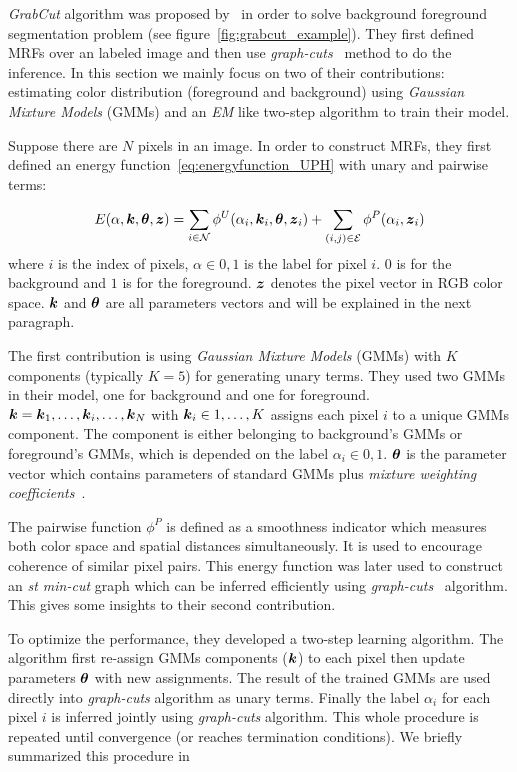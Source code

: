 \emph{GrabCut} algorithm was proposed
by~ in order to solve background
foreground segmentation problem (see
figure~\ref{fig:grabcut_example}). They first defined MRFs over
an labeled image and then use
\emph{graph-cuts}~\cite{Boykov:ICCV01} method to do the
inference. In this section we mainly focus on two of their
contributions: estimating color distribution (foreground and
background) using \emph{Gaussian Mixture Models} (GMMs) and an
\emph{EM} like two-step algorithm to train their model.

Suppose there are $N$ pixels in an image. In order to construct
MRFs, they first defined an energy
function~\eqref{eq:energyfunction_UPH} with unary and pairwise
terms:

\begin{align}
  \label{eq:grabcut_energy}
  E(\alpha, {\boldsymbol{k}}, \boldsymbol{\theta}, {\boldsymbol{z}}) = 
  \sum_{i\in {\cal N}}{\phi^U(\alpha_i, {\boldsymbol{k}}_i, \boldsymbol{\theta}, {\boldsymbol{z}}_i)}+
  \sum_{(i,j)\in {\cal E}}{\phi^P(\alpha_i,{\boldsymbol{z}}_i)}
\end{align}
where $i$ is the index of pixels, $\alpha \in {0,1}$ is the label
for pixel $i$. $0$ is for the background and $1$ is for the
foreground. ${\boldsymbol{z}}$ denotes the pixel vector in RGB color space.
${\boldsymbol{k}}$ and $\boldsymbol{\theta}$ are all parameters vectors and will be
explained in the next paragraph. 

The first contribution is using \emph{Gaussian Mixture Models}
(GMMs) with $K$ components (typically $K=5$) for generating unary
terms. They used two GMMs in their model, one for background and
one for foreground. ${\boldsymbol{k}}={{\boldsymbol{k}}_1,\dots,{\boldsymbol{k}}_i,\dots,{\boldsymbol{k}}_N}$ with
${\boldsymbol{k}}_i\in 1,\dots,K$ assigns each pixel $i$ to a unique GMMs
component. The component is either belonging to background's GMMs
or foreground's GMMs, which is depended on the label $\alpha_i\in
{0,1}$. $\boldsymbol{\theta}$ is the parameter vector which contains
parameters of standard GMMs plus \emph{mixture weighting
  coefficients}~\cite{Rother:SIGGRAPH04}.

The pairwise function $\phi^P$ is defined as a smoothness
indicator which measures both color space and spatial distances
simultaneously. It is used to encourage coherence of similar
pixel pairs. This energy function was later used to construct an
\emph{st min-cut} graph which can be inferred efficiently using
\emph{graph-cuts}~\cite{Boykov:ICCV01} algorithm. This gives some
insights to their second contribution.

To optimize the performance, they developed a two-step learning
algorithm. The algorithm first re-assign GMMs components (${\boldsymbol{k}}$)
to each pixel then update parameters $\boldsymbol{\theta}$ with new
assignments. The result of the trained GMMs are used directly
into \emph{graph-cuts} algorithm as unary terms. Finally the
label $\alpha_i$ for each pixel $i$ is inferred jointly using
\emph{graph-cuts} algorithm. This whole procedure is repeated
until convergence (or reaches termination conditions). We briefly
summarized this procedure in 

